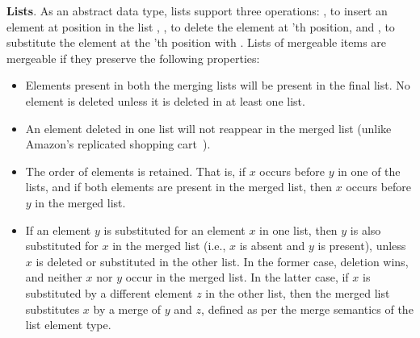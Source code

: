 

{\bf Lists}. As an abstract data type, lists support three
operations: , to insert an element  at position
 in the list , , to delete the element at
'th position, and , to substitute the element at
the 'th position with .  Lists of mergeable items are
mergeable if they preserve the following properties:
\begin{itemize}
  \item Elements present in both the merging lists will be present in
  the final list. No element is deleted unless it is deleted in at
  least one list.
  \item An element deleted in one list will not reappear in the merged
  list (unlike Amazon's replicated shopping cart~\cite{dynamo}).
  \item The order of elements is retained. That is, if $x$ occurs
  before $y$ in one of the lists, and if both elements are present in
  the merged list, then $x$ occurs before $y$ in the merged list.
\item If an element $y$ is substituted for an element $x$ in one list,
  then $y$ is also substituted for $x$ in the merged list (i.e., $x$
  is absent and $y$ is present), unless $x$ is deleted or substituted
  in the other list. In the former case, deletion wins, and neither
  $x$ nor $y$ occur in the merged list. In the latter case, if $x$ is
  substituted by a different element $z$ in the other list, then the
  merged list substitutes $x$ by a merge of $y$ and $z$, defined as
  per the merge semantics of the list element type.
\end{itemize}

